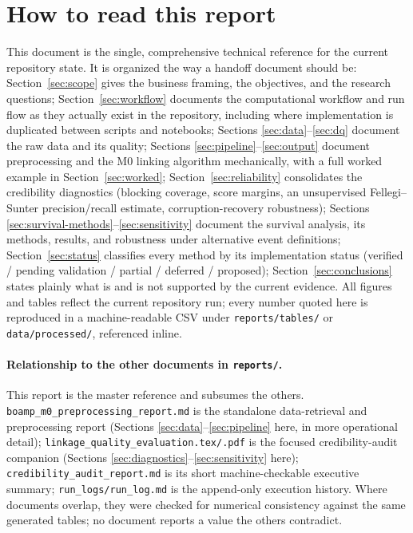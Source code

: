 \documentclass[11pt]{article}
\begin{document}
\section*{How to read this report}
This document is the single, comprehensive technical reference for the
current repository state. It is organized the way a handoff document should
be: Section~\ref{sec:scope} gives the business framing, the objectives, and
the research questions; Section~\ref{sec:workflow} documents the
computational workflow and run flow as they actually exist in the
repository, including where implementation is duplicated between scripts
and notebooks; Sections \ref{sec:data}--\ref{sec:dq} document the raw data
and its quality; Sections \ref{sec:pipeline}--\ref{sec:output} document
preprocessing and the M0 linking algorithm mechanically, with a full worked
example in Section~\ref{sec:worked}; Section~\ref{sec:reliability}
consolidates the credibility diagnostics (blocking coverage, score margins,
an unsupervised Fellegi--Sunter precision/recall estimate,
corruption-recovery robustness); Sections
\ref{sec:survival-methods}--\ref{sec:sensitivity} document the survival
analysis, its methods, results, and robustness under alternative event
definitions; Section~\ref{sec:status} classifies every method by its
implementation status (verified / pending validation / partial / deferred /
proposed); Section~\ref{sec:conclusions} states plainly what is and is not
supported by the current evidence. All figures and tables reflect the
current repository run; every number quoted here is reproduced in a
machine-readable CSV under \texttt{reports/tables/} or
\texttt{data/processed/}, referenced inline.

\paragraph{Relationship to the other documents in \texttt{reports/}.}
This report is the master reference and subsumes the others.
\texttt{boamp\_m0\_preprocessing\_report.md} is the standalone
data-retrieval and preprocessing report (Sections
\ref{sec:data}--\ref{sec:pipeline} here, in more operational detail);
\texttt{linkage\_quality\_evaluation.tex/.pdf} is the focused
credibility-audit companion (Sections
\ref{sec:diagnostics}--\ref{sec:sensitivity} here);
\texttt{credibility\_audit\_report.md} is its short machine-checkable
executive summary; \texttt{run\_logs/run\_log.md} is the append-only
execution history. Where documents overlap, they were checked for numerical
consistency against the same generated tables; no document reports a value
the others contradict.
\end{document}
